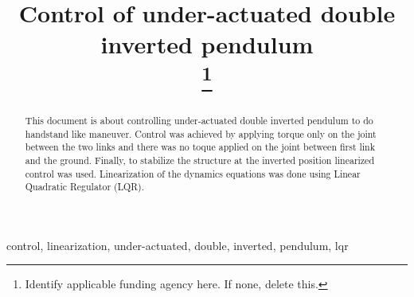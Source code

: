 \documentclass[conference]{IEEEtran}
\begin{document}
\title{Control of under-actuated double inverted pendulum\\
\thanks{Identify applicable funding agency here. If none, delete this.}
}

\author{
\and
{}
}

\maketitle

\begin{abstract}
This document is about controlling under-actuated double inverted pendulum to do handstand like maneuver. Control was achieved by applying torque only on the joint between the two links and there was no toque applied on the joint between first link and the ground. Finally, to stabilize the structure at the inverted position linearized control was used. Linearization of the dynamics equations was done using Linear Quadratic Regulator (LQR).
\end{abstract}

\begin{IEEEkeywords}
control, linearization, under-actuated, double, inverted, pendulum, lqr
\end{IEEEkeywords}
\end{document}
